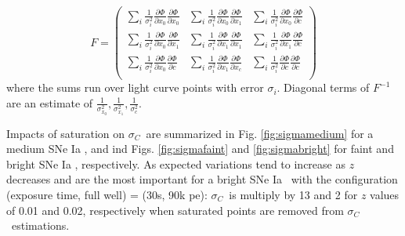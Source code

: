 \documentclass[\docopts]{\docclass}
\newcommand{\sne}{{SNe Ia }}
\newcommand{\pe}{{pe}}
\newcommand{\colorerr}{{$\sigma_C$}}
\begin{document}
$$
F = 
\begin{pmatrix}
\displaystyle \sum_{i}  \frac{1}{\sigma_i^2}\frac{\partial\Phi}{\partial x_0} \frac{\partial\Phi}{\partial x_0} & \displaystyle \sum_i  \frac{1}{\sigma_i^2}\frac{\partial\Phi}{\partial x_0} \frac{\partial\Phi}{\partial x_1}& \displaystyle  \sum_i \frac{1}{\sigma_i^2}\frac{\partial\Phi}{\partial x_0} \frac{\partial\Phi}{\partial c}\\
\displaystyle  \sum_i  \frac{1}{\sigma_i^2}\frac{\partial\Phi}{\partial x_0} \frac{\partial\Phi}{\partial x_1} & \displaystyle  \sum_i  \frac{1}{\sigma_i^2}\frac{\partial\Phi}{\partial x_1} \frac{\partial\Phi}{\partial x_1}& \displaystyle  \sum_i \frac{1}{\sigma_i^2}\frac{\partial\Phi}{\partial x_1} \frac{\partial\Phi}{\partial c}\\
\displaystyle  \sum_i  \frac{1}{\sigma_i^2}\frac{\partial\Phi}{\partial x_0} \frac{\partial\Phi}{\partial c} & \displaystyle  \sum_i  \frac{1}{\sigma_i^2}\frac{\partial\Phi}{\partial x_1} \frac{\partial\Phi}{\partial x_c}& \displaystyle  \sum_i \frac{1}{\sigma_i^2}\frac{\partial\Phi}{\partial c} \frac{\partial\Phi}{\partial c}\\
\end{pmatrix}
$$
where the sums run over light curve points with error $\sigma_i$. Diagonal terms of $F^{-1}$ are an estimate of $\frac{1}{\sigma_{x_0}^2}, \frac{1}{\sigma_{x_1}^2}, \frac{1}{\sigma_{c}^2}$.

Impacts of saturation on \colorerr~are summarized in Fig. \ref{fig:sigmamedium} for a medium \sne, and ind Figs. \ref{fig:sigmafaint} and \ref{fig:sigmabright} for faint and bright \sne, respectively. As expected variations tend to increase as $z$ decreases and are the most important for a bright \sne~with the configuration (exposure time, full well) = (30s, 90k \pe): \colorerr~is multiply by 13 and 2 for $z$ values of 0.01 and 0.02, respectively when saturated points are removed from \colorerr~estimations.
\end{document}
